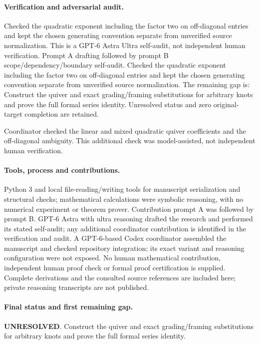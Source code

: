 \documentclass[11pt]{article}
\begin{document}
\paragraph{Verification and adversarial audit.}
Checked the quadratic exponent including the factor two on off-diagonal entries and kept the chosen generating convention separate from unverified source normalization. This is a GPT-6 Astra Ultra self-audit, not independent human verification. Prompt A drafting followed by prompt B scope/dependency/boundary self-audit. Checked the quadratic exponent including the factor two on off-diagonal entries and kept the chosen generating convention separate from unverified source normalization. The remaining gap is: Construct the quiver and exact grading/framing substitutions for arbitrary knots and prove the full formal series identity. Unresolved status and zero original-target completion are retained.

Coordinator checked the linear and mixed quadratic quiver coefficients and the off-diagonal ambiguity. This additional check was model-assisted, not independent human verification.

\paragraph{Tools, process and contributions.}
Python 3 and local file-reading/writing tools for manuscript serialization and structural checks; mathematical calculations were symbolic reasoning, with no numerical experiment or theorem prover. Contribution prompt A was followed by prompt B. GPT-6 Astra with ultra reasoning drafted the research and performed its stated self-audit; any additional coordinator contribution is identified in the verification and audit. A GPT-6-based Codex coordinator assembled the manuscript and checked repository integration; its exact variant and reasoning configuration were not exposed. No human mathematical contribution, independent human proof check or formal proof certification is supplied. Complete derivations and the consulted source references are included here; private reasoning transcripts are not published.

\paragraph{Final status and first remaining gap.}
\textbf{UNRESOLVED}. Construct the quiver and exact grading/framing substitutions for arbitrary knots and prove the full formal series identity.
\end{document}
